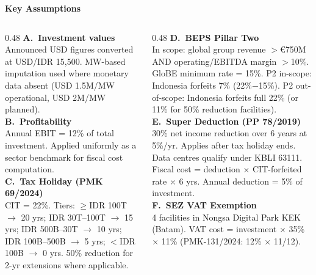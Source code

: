 \documentclass[aspectratio=169,10pt]{beamer}
\begin{document}
\begin{frame}{\textbf{Key Assumptions}}
\vspace{0.1cm}
\begin{columns}[T]
  \begin{column}{0.48\textwidth}
    \textbf{\color{navyblue}A.\ Investment values}\\[2pt]
    {\footnotesize Announced USD figures converted at USD/IDR 15,500. MW-based imputation used where monetary data absent (USD 1.5M/MW operational, USD 2M/MW planned).}\\[8pt]

    \textbf{\color{navyblue}B.\ Profitability}\\[2pt]
    {\footnotesize Annual EBIT = 12\% of total investment. Applied uniformly as a sector benchmark for fiscal cost computation.}\\[8pt]

    \textbf{\color{navyblue}C.\ Tax Holiday (PMK 69/2024)}\\[2pt]
    {\footnotesize CIT = 22\%. Tiers: $\geq$IDR 100T $\to$ 20 yrs; IDR 30T–100T $\to$ 15 yrs; IDR 500B–30T $\to$ 10 yrs; IDR 100B–500B $\to$ 5 yrs; $<$IDR 100B $\to$ 0 yrs. 50\% reduction for 2-yr extensions where applicable.}
  \end{column}
  \begin{column}{0.48\textwidth}
    \textbf{\color{navyblue}D.\ BEPS Pillar Two}\\[2pt]
    {\footnotesize In scope: global group revenue $>$€750M AND operating/EBITDA margin $>$10\%. GloBE minimum rate = 15\%. P2 in-scope: Indonesia forfeits 7\% (22\%$-$15\%). P2 out-of-scope: Indonesia forfeits full 22\% (or 11\% for 50\% reduction facilities).}\\[8pt]

    \textbf{\color{navyblue}E.\ Super Deduction (PP 78/2019)}\\[2pt]
    {\footnotesize 30\% net income reduction over 6 years at 5\%/yr. Applies after tax holiday ends. Data centres qualify under KBLI 63111. Fiscal cost = deduction $\times$ CIT-forfeited rate $\times$ 6 yrs. Annual deduction = 5\% of investment.}\\[8pt]

    \textbf{\color{navyblue}F.\ SEZ VAT Exemption}\\[2pt]
    {\footnotesize 4 facilities in Nongsa Digital Park KEK (Batam). VAT cost = investment $\times$ 35\% $\times$ 11\% (PMK-131/2024: 12\% $\times$ 11/12).}
  \end{column}
\end{columns}
\end{frame}
\end{document}
